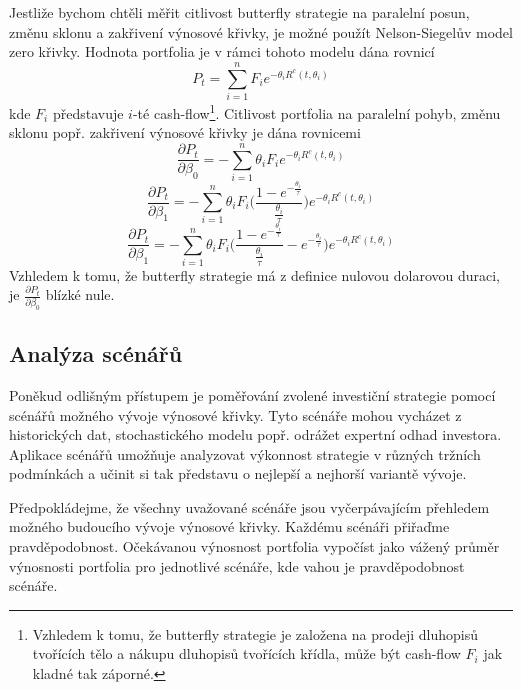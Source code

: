 \documentclass[a4paper]{book}
\begin{document}
Jestliže bychom chtěli měřit citlivost butterfly strategie na paralelní posun, změnu sklonu a zakřivení výnosové křivky, je možné použít Nelson-Siegelův model zero křivky. Hodnota portfolia je v rámci tohoto modelu dána rovnicí
\begin{equation*}
P_t = \sum_{i=1}^n F_i e^{-\theta_i R^c(t, \theta_i)}
\end{equation*}
kde $F_i$ představuje $i$-té cash-flow\footnote{Vzhledem k tomu, že butterfly strategie je založena na prodeji dluhopisů tvořících tělo a nákupu dluhopisů tvořících křídla, může být cash-flow $F_i$ jak kladné tak záporné.}. Citlivost portfolia na paralelní pohyb, změnu sklonu popř. zakřivení výnosové křivky je dána rovnicemi
\begin{equation*}
\frac{\partial P_t}{\partial \beta_0} = - \sum_{i=1}^n \theta_i F_i e^{-\theta_i R^c(t, \theta_i)}
\end{equation*}
\begin{equation*}
\frac{\partial P_t}{\partial \beta_1} = - \sum_{i=1}^n \theta_i F_i \Bigg( \frac{1 - e^{-\frac{\theta_i}{\tau}}}{\frac{\theta_i}{\tau}}\Bigg)e^{-\theta_i R^c(t, \theta_i)}
\end{equation*}
\begin{equation*}
\frac{\partial P_t}{\partial \beta_1} = - \sum_{i=1}^n \theta_i F_i \Bigg( \frac{1 - e^{-\frac{\theta_i}{\tau}}}{\frac{\theta_i}{\tau}} - e^{-\frac{\theta_i}{\tau}}\Bigg)e^{-\theta_i R^c(t, \theta_i)}
\end{equation*}
Vzhledem k tomu, že butterfly strategie má z definice nulovou dolarovou duraci, je $\frac{\partial P_t}{\partial \beta_0}$ blízké nule.

\subsection{Analýza scénářů}

Poněkud odlišným přístupem je poměřování zvolené investiční strategie pomocí scénářů možného vývoje výnosové křivky. Tyto scénáře mohou vycházet z historických dat, stochastického modelu popř. odrážet expertní odhad investora. Aplikace scénářů umožňuje analyzovat výkonnost strategie v různých tržních podmínkách a učinit si tak představu o nejlepší a nejhorší variantě vývoje.

Předpokládejme, že všechny uvažované scénáře jsou vyčerpávajícím přehledem možného budoucího vývoje výnosové křivky. Každému scénáři přiřaďme pravděpodobnost. Očekávanou výnosnost portfolia vypočíst jako vážený průměr výnosnosti portfolia pro jednotlivé scénáře, kde vahou je pravděpodobnost scénáře.
\end{document}
